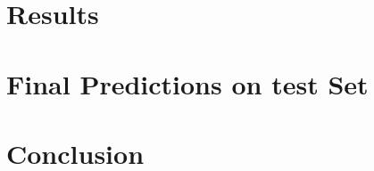 \documentclass[a4paper,12pt]{article}
\begin{document}
	\section{Results}
	
	\section{Final Predictions on test Set}
	
	\section{Conclusion}
	
\end{document}
